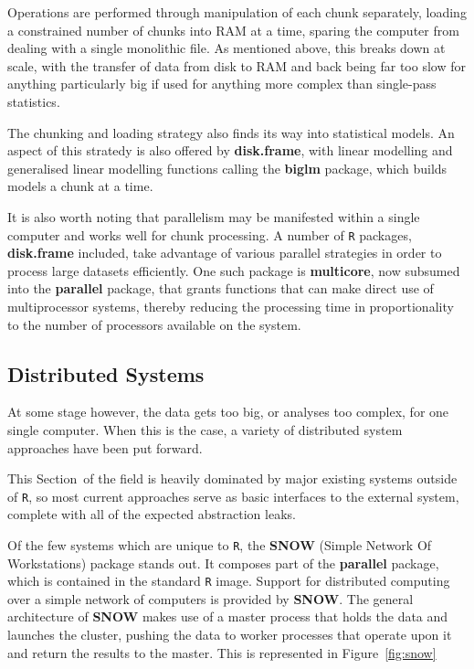

Operations are performed through manipulation of each chunk separately, loading a constrained number of chunks into RAM at a time, sparing the computer from dealing with a single monolithic file\cite{zj19:_inges_data}.
As mentioned above, this breaks down at scale, with the transfer of data from disk to RAM and back being far too slow for anything particularly big if used for anything more complex than single-pass statistics.

The chunking and loading strategy also finds its way into statistical models.
An aspect of this stratedy is also offered by \textbf{disk.frame}, with linear modelling and generalised linear modelling functions calling the \textbf{biglm} package, which builds models a chunk at a time\cite{lumley13}.

It is also worth noting that parallelism may be manifested within a single computer and works well for chunk processing.
A number of \texttt{R} packages, \textbf{disk.frame} included, take advantage of various parallel strategies in order to process large datasets efficiently.
One such package is \textbf{multicore}, now subsumed into the \textbf{parallel} package, that grants functions that can make direct use of multiprocessor systems, thereby reducing the processing time in proportionality to the number of processors available on the system\cite{team20:_r}.

\subsection{Distributed Systems}

At some stage however, the data gets too big, or analyses too complex, for one single computer.
When this is the case, a variety of distributed system approaches have been put forward.

This Section~of the field is heavily dominated by major existing systems outside of \texttt{R}, so most current approaches serve as basic interfaces to the external system, complete with all of the expected abstraction leaks\cite{spolsky2002abstraction}.

Of the few systems which are unique to \texttt{R}, the \textbf{SNOW} (Simple Network Of Workstations) package stands out.
It composes part of the \textbf{parallel} package, which is contained in the standard \texttt{R} image\cite{tierney18}.
Support for distributed computing over a simple network of computers is provided by \textbf{SNOW}.
The general architecture of \textbf{SNOW} makes use of a master process that holds the data and launches the cluster, pushing the data to worker processes that operate upon it and return the results to the master.
This is represented in Figure~\ref{fig:snow}

